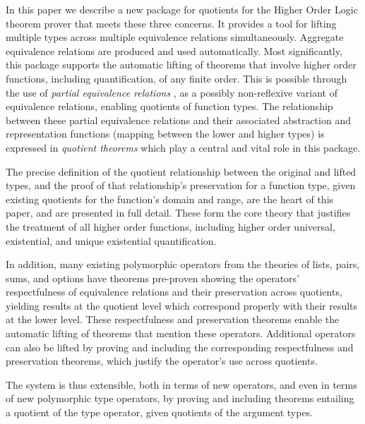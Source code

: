 \documentclass[envcountsame,runningheads]{llncs}
\newcommand{\quotient}{partial equivalence}
\begin{document}
In this paper we describe a new package for quotients for the Higher Order
Logic theorem prover that meets these three concerns.  It provides a tool
for lifting multiple types across multiple equivalence relations simultaneously.
Aggregate equivalence relations are produced and used automatically.
Most significantly, this package supports the automatic
lifting of theorems that involve higher order functions, including
quantification, of any finite order. 
This is possible through the use of
{\it \quotient{} relations}
\cite{Rob89},
as a possibly non-reflexive variant of
equivalence relations, enabling
quotients
of function types.
The relationship between these \quotient{} relations and their
associated abstraction and representation functions (mapping between the 
lower and higher types)
is expressed in {\it quotient theorems\/} which
play a central and vital role in this package.

The precise definition of the quotient relationship between the
original and lifted types, and the proof of that relationship's
preservation
for a function type,
given existing quotients
for the function's domain and range, are the heart of this paper,
and are presented in full detail.
These
form the core theory that
justifies the treatment of all higher order functions,
including higher order 
universal, existential, and unique existential quantification.

In addition, many existing polymorphic operators from the theories of
lists, pairs, sums, and options have theorems pre-proven
showing the operators' respectfulness of equivalence relations and
their preservation across quotients, yielding results at the
quotient level which correspond properly with their results at the lower level.
These respectfulness and preservation theorems enable the automatic
lifting of theorems that mention these operators.  Additional operators
can also be lifted by proving
and including
the corresponding respectfulness and preservation
theorems, which justify the operator's use across quotients.

The system is thus extensible, both in terms of new operators, and even
in terms of new polymorphic type operators, by proving and including
theorems entailing
a quotient
of the type operator,
given quotients
of the
argument types.
\end{document}
